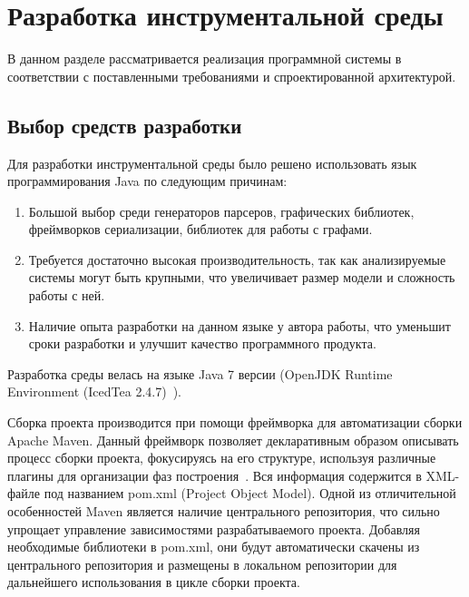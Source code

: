 \chapter{Разработка инструментальной среды}
\label{chap:realisation}

В данном разделе рассматривается реализация программной системы в соответствии
с поставленными требованиями и спроектированной архитектурой.

\section{Выбор средств разработки}

Для разработки инструментальной среды было решено использовать язык
программирования Java по следующим причинам:

\begin{enumerate}
    \item Большой выбор среди генераторов парсеров, графических библиотек,
    фреймворков сериализации, библиотек для работы с графами.
    \item Требуется достаточно высокая производительность, так как анализируемые
    системы могут быть крупными, что увеличивает размер модели и сложность
    работы с ней.
    \item Наличие опыта разработки на данном языке у автора  работы, что
    уменьшит сроки разработки и улучшит качество программного продукта.
\end{enumerate}

Разработка среды велась на языке Java 7 версии (OpenJDK Runtime Environment
(IcedTea 2.4.7)~\cite{Gosling2013}).

Сборка проекта производится при помощи фреймворка для автоматизации сборки
Apache Maven. Данный фреймворк позволяет декларативным образом описывать процесс
сборки проекта, фокусируясь на его структуре, используя различные плагины для
организации фаз построения~\cite{Maven2001-2005}. Вся информация содержится в
XML-файле под названием pom.xml (Project Object Model). Одной из отличительной
особенностей Maven является наличие центрального репозитория, что сильно
упрощает управление зависимостями разрабатываемого проекта. Добавляя необходимые
библиотеки в pom.xml, они будут автоматически скачены из центрального
репозитория и размещены в локальном репозитории для дальнейшего использования в
цикле сборки проекта.

